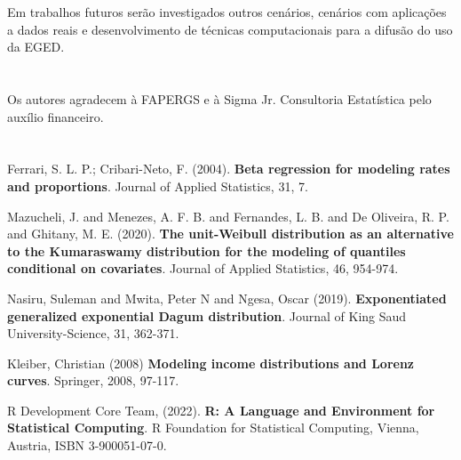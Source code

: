 \documentclass{sciposter}
\begin{document}
\begin{multicols}{3}
Em trabalhos futuros serão investigados outros cenários, cenários com aplicações a dados reais e desenvolvimento de técnicas computacionais para a difusão do uso da EGED.


\section*{}

Os autores agradecem à FAPERGS e à Sigma Jr. Consultoria Estatística pelo auxílio financeiro.


\section*{}
\begingroup
\renewcommand{\section}[2]{}
\begin{thebibliography}{99}
\small

 Ferrari, S. L. P.; Cribari-Neto, F. (2004). \textbf {Beta regression for modeling rates and proportions}. Journal of Applied Statistics, 31, 7.


 Mazucheli, J. and Menezes, A. F. B. and Fernandes, L. B. and De Oliveira, R. P. and Ghitany, M. E. (2020). \textbf{The unit-Weibull distribution as an alternative to the Kumaraswamy distribution for the modeling of quantiles conditional on covariates}. Journal of Applied Statistics, 46, 954-974.

 Nasiru, Suleman and Mwita, Peter N and Ngesa, Oscar (2019). \textbf{Exponentiated generalized exponential Dagum distribution}. Journal of King Saud University-Science, 31, 362-371.

 Kleiber, Christian (2008) \textbf{Modeling income distributions and Lorenz curves}. Springer, 2008, 97-117.


 R Development Core Team, (2022). \textbf {R: A Language and Environment for Statistical Computing}. R Foundation for Statistical Computing, Vienna, Austria, ISBN 3-900051-07-0.



 
\end{thebibliography}

\endgroup


\end{multicols}
\end{document}

